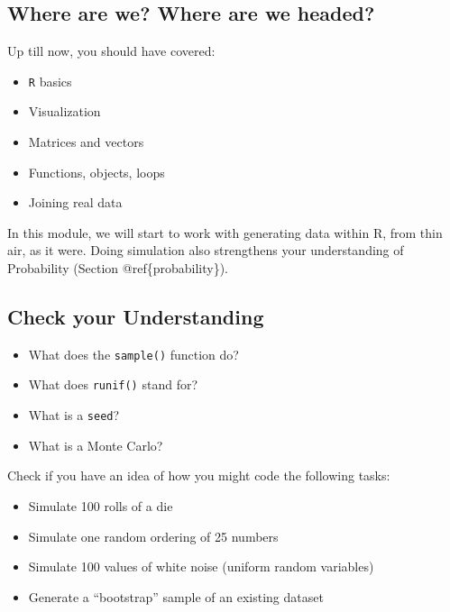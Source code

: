 \documentclass[
]{book}
\providecommand{\tightlist}{%
  \setlength{\itemsep}{0pt}\setlength{\parskip}{0pt}}
\theoremstyle{definition}
\theoremstyle{definition}
\theoremstyle{definition}
\theoremstyle{definition}
\theoremstyle{remark}
\begin{document}
\hypertarget{where-are-we-where-are-we-headed-4}{%
\subsection*{Where are we? Where are we headed?}\label{where-are-we-where-are-we-headed-4}}

Up till now, you should have covered:

\begin{itemize}
\tightlist
\item
  \texttt{R} basics
\item
  Visualization
\item
  Matrices and vectors
\item
  Functions, objects, loops
\item
  Joining real data
\end{itemize}

In this module, we will start to work with generating data within R, from thin air, as it were. Doing simulation also strengthens your understanding of Probability (Section @ref\{probability\}).

\hypertarget{check-your-understanding-2}{%
\subsection*{Check your Understanding}\label{check-your-understanding-2}}

\begin{itemize}
\tightlist
\item
  What does the \texttt{sample()} function do?
\item
  What does \texttt{runif()} stand for?
\item
  What is a \texttt{seed}?
\item
  What is a Monte Carlo?
\end{itemize}

Check if you have an idea of how you might code the following tasks:

\begin{itemize}
\tightlist
\item
  Simulate 100 rolls of a die
\item
  Simulate one random ordering of 25 numbers
\item
  Simulate 100 values of white noise (uniform random variables)
\item
  Generate a ``bootstrap'' sample of an existing dataset
\end{itemize}
\end{document}
